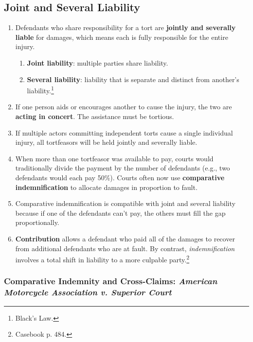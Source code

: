 \subsection{Joint and Several Liability}

\begin{enumerate}
    \item Defendants who share responsibility for a tort are \textbf{jointly 
    and severally liable} for damages, which means each is fully responsible 
    for the entire injury.
    \begin{enumerate}
        \item \textbf{Joint liability}: multiple parties share liability.
        \item \textbf{Several liability}: liability that is separate and 
        distinct from another's liability.\footnote{Black's Law.}
    \end{enumerate}
    \item If one person aids or encourages another to cause the injury, the 
    two are \textbf{acting in concert}. The assistance must be tortious.
    \item If multiple actors committing independent torts cause a single 
    individual injury, all tortfeasors will be held jointly and severally 
    liable.
    \item When more than one tortfeasor was available to pay, courts would 
    traditionally divide the payment by the number of defendants (e.g., two 
    defendants would each pay 50\%). Courts often now use \textbf{comparative 
    indemnification} to allocate damages in proportion to fault.
    \item Comparative indemnification is compatible with joint and several 
    liability because if one of the defendants can't pay, the others must fill 
    the gap proportionally.
    \item \textbf{Contribution} allows a defendant who paid all of the damages 
    to recover from additional defendants who are at fault. By contrast, 
    \emph{indemnification} involves a total shift in liability to a more 
    culpable party.\footnote{Casebook p. 484.}
\end{enumerate}

\subsubsection{Comparative Indemnity and Cross-Claims: \emph{American 
Motorcycle Association v.  Superior Court}}

